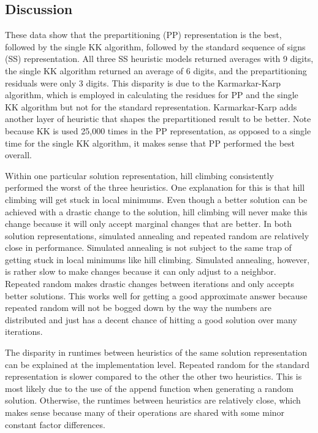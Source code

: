 \documentclass[a4paper]{article}
\begin{document}
	\subsection{Discussion}
	These data show that the prepartitioning (PP) representation is the best, followed by the single KK algorithm, followed by the standard sequence of signs (SS) representation. All three SS heuristic models returned averages with 9 digits, the single KK algorithm returned an average of 6 digits, and the prepartitioning residuals were only 3 digits. This disparity is due to the Karmarkar-Karp algorithm, which is employed in calculating the residues for PP and the single KK algorithm but not for the standard representation. Karmarkar-Karp adds another layer of heuristic that shapes the prepartitioned result to be better. Note because KK is used 25,000 times in the PP representation, as opposed to a single time for the single KK algorithm, it makes sense that PP performed the best overall. 
	
	Within one particular solution representation, hill climbing consistently performed the worst of the three heuristics. One explanation for this is that hill climbing will get stuck in local minimums. Even though a better solution can be achieved with a drastic change to the solution, hill climbing will never make this change because it will only accept marginal changes that are better. In both solution representations, simulated annealing and repeated random are relatively close in performance. Simulated annealing is not subject to the same trap of getting stuck in local minimums like hill climbing. Simulated annealing, however, is rather slow to make changes because it can only adjust to a neighbor. Repeated random makes drastic changes between iterations and only accepts better solutions. This works well for getting a good approximate answer because repeated random will not be bogged down by the way the numbers are distributed and just has a decent chance of hitting a good solution over many iterations. 
	
	The disparity in runtimes between heuristics of the same solution representation can be explained at the implementation level. Repeated random for the standard representation is slower compared to the other the other two heuristics. This is most likely due to the use of the append function when generating a random solution. Otherwise, the runtimes between heuristics are relatively close, which makes sense because many of their operations are shared with some minor constant factor differences.
	
\end{document}
